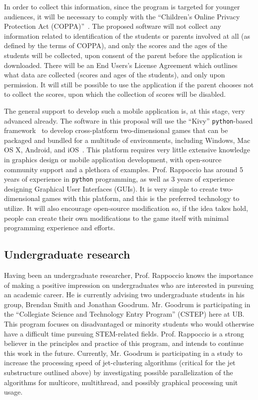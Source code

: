 \documentclass[12pt]{proposalnsf}
\begin{document}
In order to collect this information, since the program is targeted
for younger audiences, it will be necessary to comply with the
``Children’s Online Privacy Protection Act (COPPA)''~\cite{coppa}. 
The proposed software will not collect any information related to
identification of the students or parents involved at all (as defined
by the terms of COPPA), and only the scores and the ages of the
students will be collected, upon consent of the parent before the
application is downloaded. There will be an End Users's License
Agreement which outlines what data are collected (scores and ages of
the students), and only upon permission. It will still be possible to
use the application if the parent chooses not to collect the scores,
upon which the collection of scores will be disabled. 

The general support to develop such a mobile application is, at this
stage, very advanced already. The software in this proposal will use
the ``Kivy''  {\tt python}-based
framework~\cite{kivy} to develop cross-platform two-dimensional games
that can be packaged and bundled for a multitude of environments,
including Windows, Mac OS X, Android, and iOS~\cite{kivy}. This
platform requires very little extensive knowledge in graphics design
or mobile application development, with open-source
community support and a plethora of examples. Prof. Rappoccio has
around 5 years of experience in {\tt python} programming, as well as 3
years of experience designing Graphical User
Interfaces (GUIs). It is very simple to create two-dimensional games
with this platform, and this is the preferred technology to
utilize. It will also encourage open-source modification so, if the
idea takes hold, people can create their own modifications to the game
itself with minimal programming experience and efforts. 


\subsection{Undergraduate research}

Having been an undergraduate researcher, Prof. Rappoccio knows the importance
of making a positive impression on undergraduates who are interested
in pursuing an academic career. 
He is currently advising two undergraduate students in his group,
Brendan Smith and Jonathan Goodrum. Mr. Goodrum is participating in the
``Collegiate Science and Technology Entry Program'' (CSTEP) here at
UB. This program focuses on disadvantaged or minority
students who would otherwise have a difficult time pursuing
STEM-related fields. Prof. Rappoccio is a strong believer in the principles and
practice of this program, and intends to continue this work in the
future. Currently, Mr. Goodrum is participating in a study to increase
the processing speed of jet-clustering algorithms (critical for the
jet substructure outlined above) by investigating possible
parallelization of the algorithms for multicore, multithread, and
possibly graphical processing unit usage. 
\end{document}
